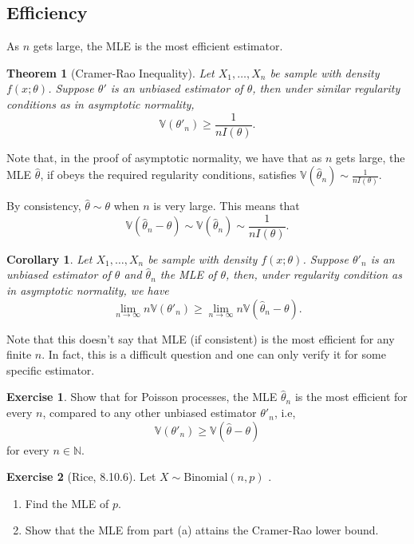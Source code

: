 \documentclass[
  openany]{book}
\newtheorem{theorem}{Theorem}[chapter]
\newtheorem{corollary}{Corollary}[chapter]
\theoremstyle{definition}
\theoremstyle{definition}
\theoremstyle{definition}
\newtheorem{exercise}{Exercise}[chapter]
\theoremstyle{definition}
\theoremstyle{remark}
\begin{document}
\subsection{Efficiency}\label{efficiency}

As \(n\) gets large, the MLE is the most efficient estimator.

\begin{theorem}[Cramer-Rao Inequality]
Let \(X_1, \dots, X_n\) be sample with density \(f(x;\theta)\).
Suppose \(\theta'\) is an unbiased estimator of \(\theta\), then
under similar regularity conditions as in asymptotic normality,
\[ \mathbb{V}(\theta'_n) \geq \frac{1}{n I(\theta)}.\]
\end{theorem}

Note that, in the proof of asymptotic normality, we have that
as \(n\) gets large, the MLE \(\hat \theta\), if obeys the required regularity conditions, satisfies
\(\mathbb{V}( \hat \theta_n )\sim \frac{1}{n I(\theta)}\).

By consistency, \(\hat \theta \sim \theta\) when \(n\) is very large.
This means that
\[\mathbb{V}( \hat \theta_n - \theta ) \sim\mathbb{V}( \hat \theta_n )\sim \frac{1}{n I(\theta)}.\]

\begin{corollary}
Let \(X_1, \dots, X_n\) be sample with density \(f(x;\theta)\).
Suppose \(\theta'_n\) is an unbiased estimator of \(\theta\) and \(\hat \theta_n\) the MLE of \(\theta\), then, under regularity condition as in asymptotic normality, we have
\[ \lim_{n\to \infty} n \mathbb{V}(\theta'_n) \geq \lim_{n\to \infty} n\mathbb{V}(\hat \theta_n - \theta) .\]
\end{corollary}

Note that this doesn't say that MLE (if consistent) is the most efficient for any finite \(n\).
In fact, this is a difficult question and one can only verify it for some
specific estimator.

\begin{exercise}
Show that for Poisson processes, the MLE \(\hat \theta_n\) is the most efficient for every \(n\), compared to any other unbiased
estimator \(\theta'_n\), i.e,
\[\mathbb{V}(\theta'_n) \geq \mathbb{V}(\hat\theta - \theta)\] for every \(n\in \mathbb{N}\).
\end{exercise}

\begin{exercise}[Rice, 8.10.6]

Let \(X \sim \mathrm{Binomial}(n,p)\) .

\begin{enumerate}
\def\labelenumi{\alph{enumi}.}
\item
  Find the MLE of \(p\).
\item
  Show that the MLE from part (a) attains the Cramer-Rao lower bound.
\end{enumerate}

\end{exercise}
\end{document}
